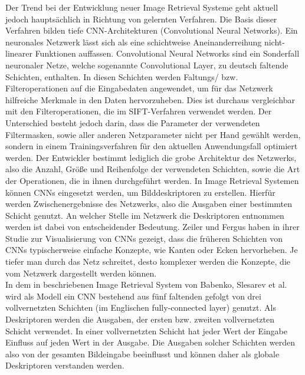Der Trend bei der Entwicklung neuer Image Retrieval Systeme geht aktuell jedoch hauptsächlich in Richtung von gelernten Verfahren. Die Basis dieser Verfahren bilden tiefe CNN-Architekturen (Convolutional Neural Networks). Ein neuronales Netzwerk lässt sich als eine schichtweise Aneinanderreihung nicht-linearer Funktionen auffassen. Convolutional Neural Networks sind ein Sonderfall neuronaler Netze, welche sogenannte Convolutional Layer, zu deutsch faltende Schichten, enthalten. In diesen Schichten werden Faltungs/ bzw. Filteroperationen auf die Eingabedaten angewendet, um für das Netzwerk hilfreiche Merkmale in den Daten hervorzuheben. Dies ist durchaus vergleichbar mit den Filteroperationen, die im SIFT-Verfahren verwendet werden. Der Unterschied besteht jedoch darin, dass die Parameter der verwendeten Filtermasken, sowie aller anderen Netzparameter nicht per Hand gewählt werden, sondern in einem Trainingsverfahren für den aktuellen Anwendungsfall optimiert werden. Der Entwickler bestimmt lediglich die grobe Architektur des Netzwerks, also die Anzahl, Größe und Reihenfolge der verwendeten Schichten, sowie die Art der Operationen, die in ihnen durchgeführt werden. In Image Retrieval Systemen können CNNs eingesetzt werden, um Bilddeskriptoren zu erstellen. Hierfür werden Zwischenergebnisse des Netzwerks, also die Ausgaben einer bestimmten Schicht genutzt. An welcher Stelle im Netzwerk die Deskriptoren entnommen werden ist dabei von entscheidender Bedeutung. Zeiler und Fergus haben in ihrer Studie zur Visualisierung von CNNs gezeigt, dass die früheren Schichten von CNNs typischerweise einfache Konzepte, wie Kanten oder Ecken hervorheben. Je tiefer man durch das Netz schreitet, desto komplexer werden die Konzepte, die vom Netzwerk dargestellt werden können.
\\
In dem in \cite{fc_extraction_neural_codes} beschriebenen Image Retrieval System von Babenko, Slesarev et al. wird als Modell ein CNN bestehend aus fünf faltenden  gefolgt von drei vollvernetzten Schichten (im Englischen fully-connected layer) genutzt. Als Deskriptoren werden die Ausgaben, der ersten bzw. zweiten vollvernetzten Schicht verwendet. In einer vollvernetzten Schicht hat jeder Wert der Eingabe Einfluss auf jeden Wert in der Ausgabe. Die Ausgaben solcher Schichten werden also von der gesamten Bildeingabe beeinflusst und können daher als globale Deskriptoren verstanden werden.
\\

